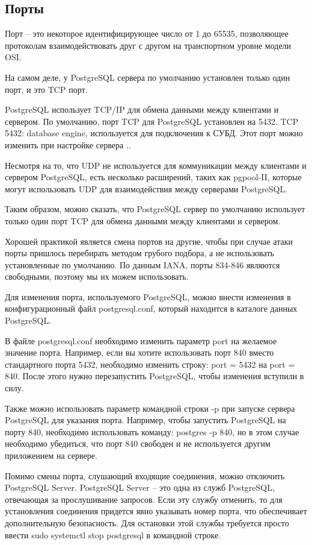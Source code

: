 \subsection{Порты}

Порт – это некоторое идентифицирующее число от 1 до 65535, позволяющее протоколам взаимодействовать друг с другом на транспортном уровне модели OSI.

На самом деле, у PostgreSQL сервера по умолчанию установлен только один порт, и это TCP порт.

PostgreSQL использует TCP/IP для обмена данными между клиентами и сервером. По умолчанию, порт TCP для PostgreSQL установлен на 5432. TCP 5432: database engine, используется для подключения к СУБД. Этот порт можно изменить при настройке сервера \cite{online7}..

Несмотря на то, что UDP не используется для коммуникации между клиентами и сервером PostgreSQL, есть несколько расширений, таких как pgpool-II, которые могут использовать UDP для взаимодействия между серверами PostgreSQL.

Таким образом, можно сказать, что PostgreSQL сервер по умолчанию использует только один порт TCP для обмена данными между клиентами и сервером.

Хорошей практикой является смена портов на другие, чтобы при случае атаки порты пришлось перебирать методом грубого подбора, а не использовать установленные по умолчанию. По данным IANA, порты 834-846 являются свободными, поэтому мы их можем использовать.

Для изменения порта, используемого PostgreSQL, можно внести изменения в конфигурационный файл postgresql.conf, который находится в каталоге данных PostgreSQL.

В файле postgresql.conf необходимо изменить параметр port на желаемое значение порта. Например, если вы хотите использовать порт 840 вместо стандартного порта 5432, необходимо изменить строку: port = 5432 на port = 840. После этого нужно перезапустить PostgreSQL, чтобы изменения вступили в силу.

Также можно использовать параметр командной строки -p при запуске сервера PostgreSQL для указания порта. Например, чтобы запустить PostgreSQL на порту 840, необходимо использовать команду: postgres -p 840, но в этом случае необходимо убедиться, что порт 840 свободен и не используется другим приложением на сервере.

Помимо смены порта, слушающий входящие соединения, можно отключить PostgreSQL Server. PostgreSQL Server – это одна из служб PostgreSQL, отвечающая за прослушивание запросов. Если эту службу отменить, то для установления соединения придется явно указывать номер порта, что обеспечивает дополнительную безопасность. Для остановки этой службы требуется просто ввести sudo systemctl stop postgresql в командной строке.



